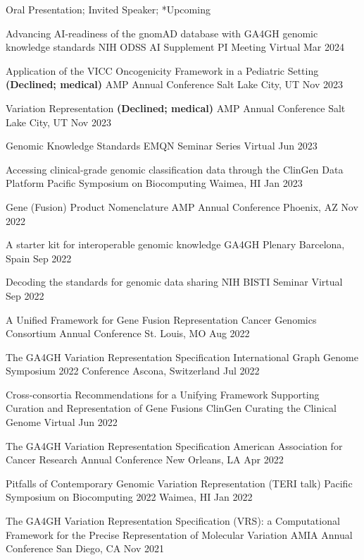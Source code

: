\textsuperscript{\textdagger}Oral Presentation; \textsuperscript{\textdaggerdbl}Invited Speaker; *Upcoming

\invited
{Advancing AI-readiness of the gnomAD database with GA4GH genomic knowledge standards}
{NIH ODSS AI Supplement PI Meeting}
{Virtual}
{Mar 2024}

\invited
{Application of the VICC Oncogenicity Framework in a Pediatric Setting \textbf{(Declined; medical)}}
{AMP Annual Conference}
{Salt Lake City, UT}
{Nov 2023}

\invited
{Variation Representation \textbf{(Declined; medical)}}
{AMP Annual Conference}
{Salt Lake City, UT}
{Nov 2023}

\invited
{Genomic Knowledge Standards}
{EMQN Seminar Series}
{Virtual}
{Jun 2023}

\oral
{Accessing clinical-grade genomic classification data through the ClinGen Data Platform}
{Pacific Symposium on Biocomputing}
{Waimea, HI}
{Jan 2023}

\invited
{Gene (Fusion) Product Nomenclature}
{AMP Annual Conference}
{Phoenix, AZ}
{Nov 2022}

\invited
{A starter kit for interoperable genomic knowledge}
{GA4GH Plenary}
{Barcelona, Spain}
{Sep 2022}

\invited
{Decoding the standards for genomic data sharing}
{NIH BISTI Seminar}
{Virtual}
{Sep 2022}

\oral
{A Unified Framework for Gene Fusion Representation}
{Cancer Genomics Consortium Annual Conference}
{St. Louis, MO}
{Aug 2022}

\invited
{The GA4GH Variation Representation Specification}
{International Graph Genome Symposium 2022 Conference}
{Ascona, Switzerland}
{Jul 2022}

\oral
{Cross-consortia Recommendations for a Unifying Framework Supporting Curation and Representation of Gene Fusions}
{ClinGen Curating the Clinical Genome}
{Virtual}
{Jun 2022}

\poster
{The GA4GH Variation Representation Specification}
{American Association for Cancer Research Annual Conference}
{New Orleans, LA}
{Apr 2022}

\invited
{Pitfalls of Contemporary Genomic Variation Representation (TERI talk)}
{Pacific Symposium on Biocomputing 2022}
{Waimea, HI}
{Jan 2022}

\oral
{The GA4GH Variation Representation Specification (VRS): a Computational Framework for the Precise Representation of Molecular Variation}
{AMIA Annual Conference}
{San Diego, CA}
{Nov 2021}

